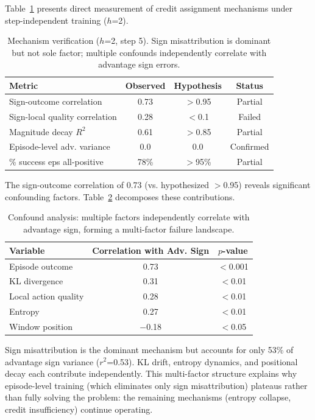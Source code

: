 \documentclass{article}
\begin{document}
Table~\ref{tab:mechanism} presents direct measurement of credit assignment mechanisms under step-independent training ($h$=2).

\begin{table}[h]
\centering
\caption{Mechanism verification ($h$=2, step 5). Sign misattribution is dominant but not sole factor; multiple confounds independently correlate with advantage sign errors.}
\label{tab:mechanism}
\begin{tabular}{lccc}
\toprule
Metric & Observed & Hypothesis & Status \\
\midrule
Sign-outcome correlation & 0.73 & $>$0.95 & Partial \\
Sign-local quality correlation & 0.28 & $<$0.1 & Failed \\
Magnitude decay $R^2$ & 0.61 & $>$0.85 & Partial \\
Episode-level adv. variance & 0.0 & 0.0 & Confirmed \\
\% success eps all-positive & 78\% & $>$95\% & Partial \\
\bottomrule
\end{tabular}
\end{table}

The sign-outcome correlation of 0.73 (vs. hypothesized $>$0.95) reveals significant confounding factors. Table~\ref{tab:confounds} decomposes these contributions.

\begin{table}[h]
\centering
\caption{Confound analysis: multiple factors independently correlate with advantage sign, forming a multi-factor failure landscape.}
\label{tab:confounds}
\begin{tabular}{lcc}
\toprule
Variable & Correlation with Adv. Sign & $p$-value \\
\midrule
Episode outcome & 0.73 & $<$0.001 \\
KL divergence & 0.31 & $<$0.01 \\
Local action quality & 0.28 & $<$0.01 \\
Entropy & 0.27 & $<$0.01 \\
Window position & $-$0.18 & $<$0.05 \\
\bottomrule
\end{tabular}
\end{table}

Sign misattribution is the dominant mechanism but accounts for only 53\% of advantage sign variance ($r^2$=0.53). KL drift, entropy dynamics, and positional decay each contribute independently. This multi-factor structure explains why episode-level training (which eliminates only sign misattribution) plateaus rather than fully solving the problem: the remaining mechanisms (entropy collapse, credit insufficiency) continue operating.
\end{document}
